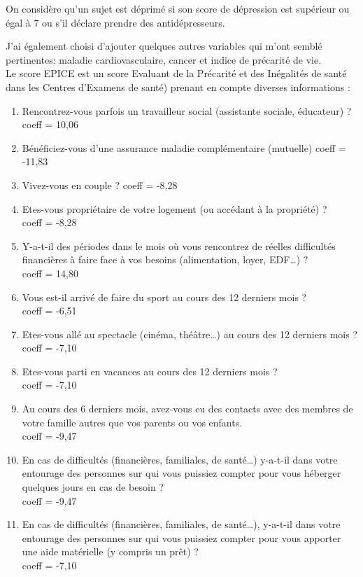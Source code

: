 \documentclass{book}
\begin{document}
\noindent
On considère qu'un sujet est déprimé si son score de dépression est supérieur ou égal à 7 ou s'il déclare prendre des antidépresseurs.\\

\smallskip

\noindent
J'ai également choisi d'ajouter quelques autres variables qui m'ont semblé pertinentes: maladie cardiovasculaire, cancer et indice de précarité de vie. \\%

\bigskip
\noindent
Le score EPICE est un score Evaluant de la Précarité et des Inégalités de santé dans les Centres d'Examens
de santé) prenant en compte diverses informations :
\begin{enumerate}
\item Rencontrez-vous parfois un travailleur social (assistante sociale, éducateur) ?\\
coeff = 10,06
\item Bénéficiez-vous d'une assurance maladie complémentaire (mutuelle) coeff = -11,83
\item Vivez-vous en couple ? coeff = -8,28
\item Etes-vous propriétaire de votre logement (ou accédant à la propriété) ?\\
coeff = -8,28
\item Y-a-t-il des périodes dans le mois où vous rencontrez de réelles difficultés financières à faire face à vos besoins (alimentation, loyer, EDF…) ?\\
coeff = 14,80
\item Vous est-il arrivé de faire du sport au cours des 12 derniers mois ?\\
coeff = -6,51
\item Etes-vous allé au spectacle (cinéma, théâtre…) au cours des 12 derniers mois ?\\
coeff = -7,10
\item Etes-vous parti en vacances au cours des 12 derniers mois ?\\
coeff = -7,10
\item Au cours des 6 derniers mois, avez-vous eu des contacts avec des membres de votre famille autres que vos parents ou vos enfants.\\
coeff = -9,47
\item En cas de difficultés (financières, familiales, de santé…) y-a-t-il dans votre entourage des personnes sur qui vous puissiez compter pour vous héberger quelques jours en cas de besoin ?\\
coeff = -9,47
\item En cas de difficultés (financières, familiales, de santé…), y-a-t-il dans votre entourage des personnes sur qui vous puissiez compter pour vous apporter une aide matérielle (y compris un prêt) ?\\
coeff = -7,10
\end{enumerate}
\end{document}
